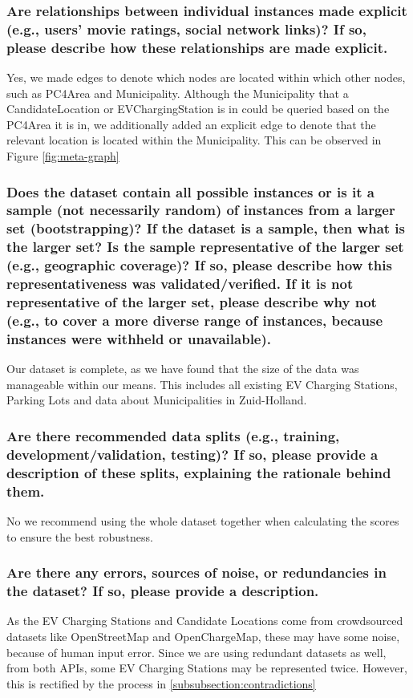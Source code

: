 \documentclass{article}
\newcommand{\question}[1]{#1}
\begin{document}
\question{\subsubsection*{Are relationships between individual instances made explicit (e.g.,
		users’ movie ratings, social network links)? If so, please describe
		how these relationships are made explicit.}}
Yes, we made edges to denote which nodes are located within which other nodes, such as PC4Area and Municipality. Although the Municipality that a CandidateLocation or EVChargingStation is in could be queried based on the PC4Area it is in, we additionally added an explicit edge to denote that the relevant location is located within the Municipality. This can be observed in Figure \ref{fig:meta-graph}

\question{\subsubsection*{Does the dataset contain all possible instances or is it a sample (not
		necessarily random) of instances from a larger set (bootstrapping)? If the dataset is
		a sample, then what is the larger set? Is the sample representative of the
		larger set (e.g., geographic coverage)? If so, please describe how this
		representativeness was validated/verified. If it is not representative of the
		larger set, please describe why not (e.g., to cover a more diverse range of
		instances, because instances were withheld or unavailable).}}
Our dataset is complete, as we have found that the size of the data was manageable within our means. This includes all existing EV Charging Stations, Parking Lots and data about Municipalities in Zuid-Holland.

\question{\subsubsection*{Are there recommended data splits (e.g., training, development/validation, testing)? If so, please provide a description of these splits, explaining the rationale behind them.}}
No we recommend using the whole dataset together when calculating the scores to ensure the best robustness.

\question{\subsubsection*{Are there any errors, sources of noise, or redundancies in the dataset? If so, please provide a description.}}
As the EV Charging Stations and Candidate Locations come from crowdsourced datasets like OpenStreetMap and OpenChargeMap, these may have some noise, because of human input error. Since we are using redundant datasets as well, from both APIs, some EV Charging Stations may be represented twice. However, this is rectified by the process in \ref{subsubsection:contradictions}
\end{document}
